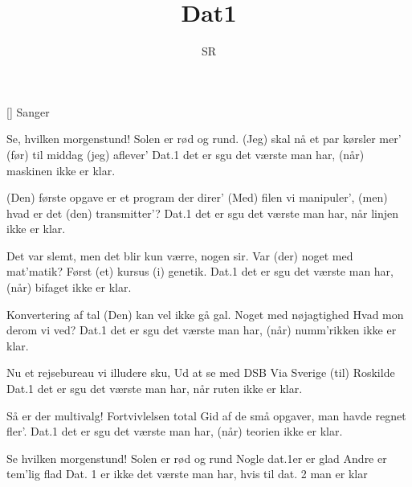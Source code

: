 \documentclass[a4paper,11pt]{article}
\title{Dat1}
\author{SR}
\begin{document}
\maketitle

\begin{roles}
[] Sanger
\end{roles}

\begin{song}
Se, hvilken morgenstund!
Solen er rød og rund.
(Jeg) skal nå et par kørsler mer'
(før) til middag (jeg) aflever'
Dat.1 det er sgu det værste man har,
(når) maskinen ikke er klar.

(Den) første opgave er
et program der direr'
(Med) filen vi manipuler',
(men) hvad er det (den) transmitter'?
Dat.1 det er sgu det værste man har,
når linjen ikke er klar.

Det var slemt, men det blir
kun værre, nogen sir.
Var (der) noget med mat'matik?
Først (et) kursus (i) genetik.
Dat.1 det er sgu det værste man har,
(når) bifaget ikke er klar.

Konvertering af tal
(Den) kan vel ikke gå gal.
Noget med nøjagtighed
Hvad mon derom vi ved?
Dat.1 det er sgu det værste man har,
(når) numm'rikken ikke er klar.

Nu et rejsebureau
vi illudere sku,
Ud at se med DSB
Via Sverige (til) Roskilde
Dat.1 det er sgu det værste man har,
når ruten ikke er klar.

Så er der multivalg!
Fortvivlelsen total
Gid af de små opgaver,
man havde regnet fler'.
Dat.1 det er sgu det værste man har,
(når) teorien ikke er klar.

Se hvilken morgenstund!
Solen er rød og rund
Nogle dat.1er er glad
Andre er tem'lig flad
Dat. 1 er ikke det værste man har,
hvis til dat. 2 man er klar

\end{song}
\end{document}
